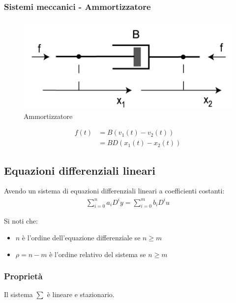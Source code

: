 \subsubsection{Sistemi meccanici - Ammortizzatore}
\begin{figure}[!ht]
	\centering
	\includegraphics[width=0.3\columnwidth]{./images/ammortizzatore.png}
	\caption{Ammortizzatore}
	  \label{fig:ammortizzatore}
\end{figure}

\begin{align}
	f(t) &= B(v_1(t) - v_2(t)) \\
  &= BD(x_1(t) - x_2(t))
\end{align}




\subsection{Equazioni differenziali lineari}
Avendo un sistema di equazioni differenziali lineari a coefficienti costanti:
\begin{align}
  \sum_{i=0}^{n} a_i D^i y = \sum_{i=0}^{m} b_i D^i u
\end{align}


Si noti che:
\begin{itemize}
  \item $n$ è l'ordine dell'equazione differenziale se $n \geq m$
  \item $\rho = n - m$ è l'ordine relativo del sistema se $n \geq m$
\end{itemize}

\subsubsection{Proprietà}

Il sistema $\sum$ è lineare e stazionario.


